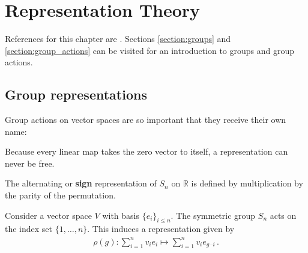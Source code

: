 \chapter{Representation Theory}

    References for this chapter are \cite{fultonharris, jeevanjee}. Sections \ref{section:groups} and \ref{section:group_actions} can be visited for an introduction to groups and group actions.

\section{Group representations}

    Group actions on vector spaces are so important that they receive their own name:
    \begin{property}[Freeness]
        Because every linear map takes the zero vector to itself, a representation can never be free.
    \end{property}


    \begin{example}\label{rep:sign_representation}
        The alternating or \textbf{sign} representation of $S_n$ on $\mathbb{R}$ is defined by multiplication by the parity of the permutation.
    \end{example}

    \begin{example}\label{rep:permutation}
        Consider a vector space $V$ with basis $\{e_i\}_{i\leq n}$. The symmetric group $S_n$ acts on the index set $\{1,\ldots,n\}$. This induces a representation given by
        \begin{gather}
            \rho(g):\sum_{i=1}^nv_ie_i\mapsto\sum_{i=1}^nv_ie_{g\cdot i}\,.
        \end{gather}
    \end{example}

